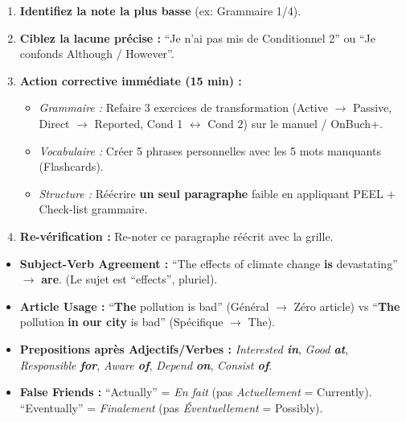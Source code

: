 \documentclass[11pt]{article}
\begin{document}
\begin{methode}
\begin{enumerate}
    \item \textbf{Identifiez la note la plus basse} (ex: Grammaire 1/4).
    \item \textbf{Ciblez la lacune précise :} ``Je n'ai pas mis de Conditionnel 2'' ou ``Je confonds Although / However''.
    \item \textbf{Action corrective immédiate (15 min) :}
    \begin{itemize}
        \item \textit{Grammaire :} Refaire 3 exercices de transformation (Active $\rightarrow$ Passive, Direct $\rightarrow$ Reported, Cond 1 $\leftrightarrow$ Cond 2) sur le manuel / OnBuch+.
        \item \textit{Vocabulaire :} Créer 5 phrases personnelles avec les 5 mots manquants (Flashcards).
        \item \textit{Structure :} Réécrire \textbf{un seul paragraphe} faible en appliquant PEEL + Check-list grammaire.
    \end{itemize}
    \item \textbf{Re-vérification :} Re-noter ce paragraphe réécrit avec la grille.
\end{enumerate}
\end{methode}

\begin{attention}
\begin{itemize}
    \item \textbf{Subject-Verb Agreement :} ``The effects of climate change \textbf{is} devastating'' $\rightarrow$ \textbf{are}. (Le sujet est ``effects'', pluriel).
    \item \textbf{Article Usage :} ``\textbf{The} pollution is bad'' (Général $\rightarrow$ Zéro article) vs ``\textbf{The} pollution \textbf{in our city} is bad'' (Spécifique $\rightarrow$ The).
    \item \textbf{Prepositions après Adjectifs/Verbes :} \textit{Interested \textbf{in}}, \textit{Good \textbf{at}}, \textit{Responsible \textbf{for}}, \textit{Aware \textbf{of}}, \textit{Depend \textbf{on}}, \textit{Consist \textbf{of}}.
    \item \textbf{False Friends :} ``Actually'' = \textit{En fait} (pas \textit{Actuellement} = Currently). ``Eventually'' = \textit{Finalement} (pas \textit{Éventuellement} = Possibly).
\end{itemize}
\end{attention}
\end{document}
